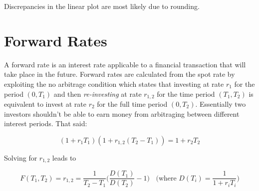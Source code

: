 Discrepancies in the linear plot are most likely due to rounding.

\section{Forward Rates}\label{calculating-forward-rates}

A forward rate is an interest rate applicable to a financial transaction that will take place in the future. Forward rates are calculated from the spot rate by exploiting the no arbitrage condition which states that investing at rate \(r_1\) for the period \((0, T_1)\) and then \emph{re-investing} at rate \(r_{1,2}\) for the time period \((T_1, T_2)\) is equivalent to invest at rate \(r_2\) for the full time period \((0, T_2)\). Essentially two investors shouldn't be able to earn money from arbitraging between different interest periods. That said:

\[(1+r_1 T_1)(1+r_{1,2}(T_2 - T_1)) = 1 + r_2 T_2\]

Solving for \(r_{1,2}\) leads to

\[F(T_1, T_2) = r_{1,2} = \frac{1}{T_2-T_1}\Big(\frac{D(T_1)}{D(T_2)} - 1 \Big)~~~~\textrm{(where $D{(T_i)}=\frac{1}{1+r_iT_{i}}$)}\]

